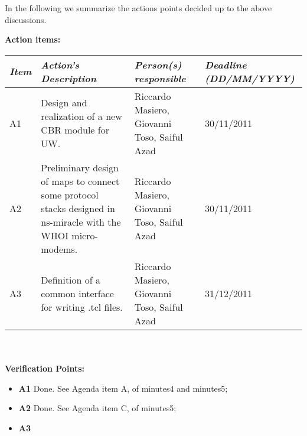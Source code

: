 \documentclass[11pt,journal,draftclsnofoot,onecolumn,twoside,letterpaper]{IEEEtran}
\theoremstyle{definition} \newtheorem{definition}[]{Definition}
\theoremstyle{theorem} \newtheorem{theorem}[]{Theorem}
\begin{document}
\newpage


In the following we summarize the actions points decided up to the above discussions.

{\bf Action items:}\\

\begin{tabular}{|p{}|p{}|p{}|p{}|}
\hline
{\it Item} & {\it Action's Description} & {\it Person(s) responsible} & {\it Deadline (DD/MM/YYYY)}\\
\hline
A1 & Design and realization of a new CBR module for UW. & Riccardo Masiero, Giovanni Toso, Saiful Azad & 30/11/2011\\ 
A2 & Preliminary design of maps to connect some protocol stacks designed in ns-miracle with the WHOI micro-modems. & Riccardo Masiero, Giovanni Toso, Saiful Azad & 30/11/2011\\ 
A3 & Definition of a common interface for writing .tcl files. & Riccardo Masiero, Giovanni Toso, Saiful Azad & 31/12/2011\\
\hline
\end{tabular}
\ \\
\ \\
{\bf Verification Points:}
\begin{itemize}
 \item {\bf A1} Done. See Agenda item A, of minutes4 and minutes5;
 \item {\bf A2} Done. See Agenda item C, of minutes5;
 \item {\bf A3} 
\end{itemize}
\end{document}
